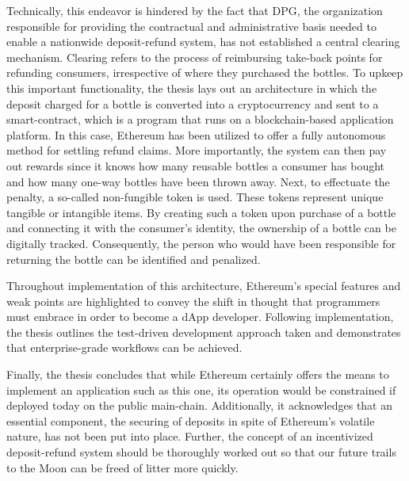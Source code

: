 Technically, this endeavor is hindered by the fact that \acf{DPG}, the organization responsible for providing the contractual and administrative basis needed to enable a nationwide deposit-refund system, has not established a central clearing mechanism. Clearing refers to the process of reimbursing take-back points for refunding consumers, irrespective of where they purchased the bottles. To upkeep this important functionality, the thesis lays out an architecture in which the deposit charged for a bottle is converted into a cryptocurrency and sent to a smart-contract, which is a program that runs on a blockchain-based application platform. In this case, Ethereum has been utilized to offer a fully autonomous method for settling refund claims. More importantly, the system can then pay out rewards since it knows how many reusable bottles a consumer has bought and how many one-way bottles have been thrown away. Next, to effectuate the penalty, a so-called non-fungible token is used. These tokens represent unique tangible or intangible items. By creating such a token upon purchase of a bottle and connecting it with the consumer's identity, the ownership of a bottle can be digitally tracked. Consequently, the person who would have been responsible for returning the bottle can be identified and penalized. 

Throughout implementation of this architecture, Ethereum's special features and weak points are highlighted to convey the shift in thought that programmers must embrace in order to become a \acf{dApp} developer. Following implementation, the thesis outlines the test-driven development approach taken and demonstrates that enterprise-grade workflows can be achieved.

Finally, the thesis concludes that while Ethereum certainly offers the means to implement an application such as this one, its operation would be constrained if deployed today on the public main-chain. Additionally, it acknowledges that an essential component, the securing of deposits in spite of Ethereum's volatile nature, has not been put into place. Further, the concept of an incentivized deposit-refund system should be thoroughly worked out so that our future trails to the Moon can be freed of litter more quickly.





